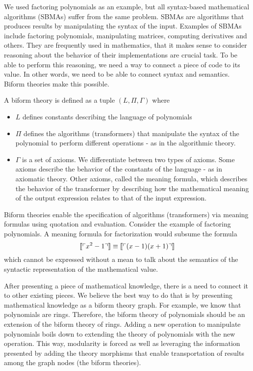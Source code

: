 \documentclass[fleqn]{llncs}
\begin{document}
We used factoring polynomials as an example, but all syntax-based mathematical
algorithms (SBMAs) suffer from the same problem. SBMAs are algorithms that
produces results by manipulating the syntax of the input. Examples of SBMAs
include factoring polynomials, manipulating matrices, computing derivatives and
others. They are frequently used in mathematics, that it makes sense to
consider reasoning about the behavior of their implementations are crucial
task.  To be able to perform this reasoning, we need a way to connect a piece
of code to its value. In other words, we need to be able to connect syntax and
semantics. Biform theories make this possible. 

A biform theory is defined as a tuple $(L,\Pi, \Gamma)$ where 
\begin{itemize}
	\item $L$ defines constants describing the language of polynomials
	\item $\Pi$ defines the algorithms (transformers) that manipulate the syntax of the polynomial to perform different operations - as in the algorithmic theory. 
	\item $\Gamma$ is a set of axioms. We differentiate between two types of axioms. Some axioms describe the behavior of the constants of the language - as in axiomatic theory. Other axioms, called the meaning formula, which describes the behavior of the transformer by describing how the mathematical meaning of the output expression relates to that of the input expression. 
\end{itemize}
Biform theories enable the specification of algorithms (transformers) via meaning formulas using quotation and evaluation. Consider the example of factoring polynomials. A meaning formula for factorization would subsume the formula 
\begin{equation*}
\llbracket \ulcorner x^2 - 1\urcorner \rrbracket \equiv \llbracket\ulcorner(x - 1)(x + 1)\urcorner\rrbracket
\end{equation*}
which cannot be expressed without a mean to talk about the semantics of the syntactic representation of the mathematical value. 
 
After presenting a piece of mathematical knowledge, there is a need to connect it to other existing pieces. We believe the best way to do that is by presenting mathematical knowledge as a biform theory graph. For example, we know that polynomials are rings. Therefore, the biform theory of polynomials should be an extension of the biform theory of rings. Adding a new operation to manipulate polynomials boils down to extending the theory of polynomials with the new operation. This way, modularity is forced as well as leveraging the information presented by adding the theory morphisms that enable transportation of results among the graph nodes (the biform theories).  
\end{document}
